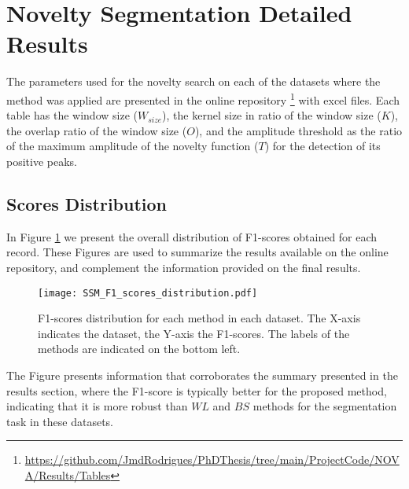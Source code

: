 \section{Novelty Segmentation Detailed Results}
\label{app_sec:detailed_results}

The parameters used for the novelty search on each of the datasets where the method was applied are presented in the online repository \footnote{\url{https://github.com/JmdRodrigues/PhDThesis/tree/main/ProjectCode/NOVA/Results/Tables}} with excel files. Each table has the window size ($W_{size}$), the kernel size in ratio of the window size ($K$), the overlap ratio of the window size ($O$), and the amplitude threshold as the ratio of the maximum amplitude of the novelty function ($T$) for the detection of its positive peaks.

\subsection{Scores Distribution}

In Figure \ref{fig:f1_scores} we present the overall distribution of F1-scores obtained for each record. These Figures are used to summarize the results available on the online repository, and complement the information provided on the final results.

\begin{figure}
\texttt{[image: SSM\_F1\_scores\_distribution.pdf]}
\caption{F1-scores distribution for each method in each dataset. The X-axis indicates the dataset, the Y-axis the F1-scores. The labels of the methods are indicated on the bottom left.}
\label{fig:f1_scores}
\end{figure}

The Figure presents information that corroborates the summary presented in the results section, where the F1-score is typically better for the proposed method, indicating that it is more robust than $WL$ and $BS$ methods for the segmentation task in these datasets.

